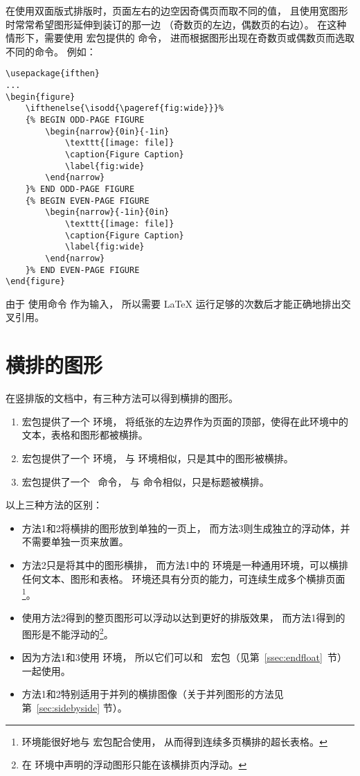 在使用双面版式排版时，页面左右的边空因奇偶页而取不同的值，
且使用宽图形时常常希望图形延伸到装订的那一边
（奇数页的左边，偶数页的右边）。
在这种情形下，需要使用  宏包提供的  命令，
进而根据图形出现在奇数页或偶数页而选取不同的命令。
例如：
\begin{lstlisting}
\usepackage{ifthen}
...
\begin{figure}
	\ifthenelse{\isodd{\pageref{fig:wide}}}%
	{% BEGIN ODD-PAGE FIGURE
		\begin{narrow}{0in}{-1in}
			\texttt{[image: file]}
			\caption{Figure Caption}
			\label{fig:wide}
		\end{narrow}
	}% END ODD-PAGE FIGURE
	{% BEGIN EVEN-PAGE FIGURE
		\begin{narrow}{-1in}{0in}
			\texttt{[image: file]}
			\caption{Figure Caption}
			\label{fig:wide}
		\end{narrow}
	}% END EVEN-PAGE FIGURE
\end{figure}
\end{lstlisting}
由于  使用命令  作为输入，
所以需要 \LaTeX{} 运行足够的次数后才能正确地排出交叉引用。


\section{横排的图形}\label{sec:lscapefig}

在竖排版的文档中，有三种方法可以得到横排的图形。
\begin{enumerate}
	\item {} 宏包提供了一个  环境，
	将纸张的左边界作为页面的顶部，使得在此环境中的文本，表格和图形都被横排。
	\item {} 宏包提供了一个  环境，
	与  环境相似，只是其中的图形被横排。
	\item {} 宏包提供了一个 ~命令，
	与  命令相似，只是标题被横排。
\end{enumerate}

以上三种方法的区别：
\begin{itemize}
	\item 方法1和2将横排的图形放到单独的一页上，
	而方法3则生成独立的浮动体，并不需要单独一页来放置。
	\item 方法2只是将其中的图形横排，
	而方法1中的  环境是一种通用环境，可以横排任何文本、图形和表格。
	 环境还具有分页的能力，可连续生成多个横排页面\footnote
		{ 环境能很好地与  宏包配合使用，
		从而得到连续多页横排的超长表格。}。
	\item 使用方法2得到的整页图形可以浮动以达到更好的排版效果，
	而方法1得到的图形是不能浮动的\footnote{
		在 环境中声明的浮动图形只能在该横排页内浮动。}。
	\item 因为方法1和3使用  环境，
	所以它们可以和 ~宏包（见第~\ref{ssec:endfloat}~节）一起使用。
	\item 方法1和2特别适用于并列的横排图像（关于并列图形的方法见第~\ref{sec:sidebyside} 节）。
\end{itemize}

